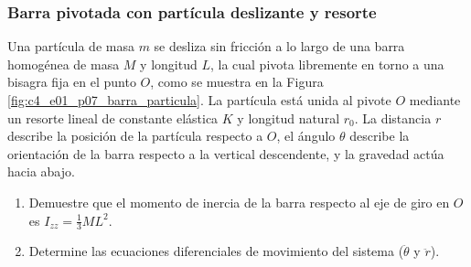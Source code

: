 \subsubsection{Barra pivotada con partícula deslizante y resorte}

Una partícula de masa $m$ se desliza sin fricción a lo largo de una barra homogénea de masa
$M$ y longitud $L$, la cual pivota libremente en torno a una bisagra fija en el punto $O$,
como se muestra en la Figura \ref{fig:c4_e01_p07_barra_particula}. La partícula está unida al
pivote $O$ mediante un resorte lineal de constante elástica $K$ y longitud natural $r_0$. La
distancia $r$ describe la posición de la partícula respecto a $O$, el ángulo $\theta$ describe
la orientación de la barra respecto a la vertical descendente, y la gravedad actúa hacia abajo.

\begin{enumerate}
    \item Demuestre que el momento de inercia de la barra respecto al eje de giro en $O$ es
          $I_{zz}=\tfrac13 ML^2$.
    \item Determine las ecuaciones diferenciales de movimiento del sistema
          ($\ddot{\theta}$ y $\ddot{r}$).
\end{enumerate}

